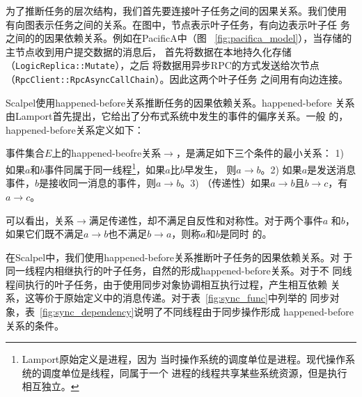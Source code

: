 
为了推断任务的层次结构，我们首先要连接叶子任务之间的因果关系。我们使用
有向图表示任务之间的关系。在图中，节点表示叶子任务，有向边表示叶子任
务之间的的因果依赖关系。例如在PacificA中（图
~\ref{fig:pacifica_model}），当存储的主节点收到用户提交数据的消息后，
首先将数据在本地持久化存储（\texttt{Logic\-Replica\-::Mutate}），之后
将数据用异步RPC的方式发送给次节点
（\texttt{Rpc\-Client\-::RpcAsync\-Call\-Chain}）。因此这两个叶子任务
之间用有向边连接。

Scalpel使用happened-before关系推断任务的因果依赖关系。happened-before
关系由Lamport首先提出，它给出了分布式系统中发生的事件的偏序关系。一般
的，happened-before关系定义如下：

\begin{definition}

事件集合$E$上的happened-beofre关系$\to$，是满足如下三个条件的最小关系：
1) 如果$a$和$b$事件同属于同一线程\footnote{Lamport原始定义是进程，因为
当时操作系统的调度单位是进程。现代操作系统的调度单位是线程，同属于一个
进程的线程共享某些系统资源，但是执行相互独立。}，如果$a$比$b$早发生，
则$a \to b$。2) 如果$a$是发送消息事件，$b$是接收同一消息的事件，则$a
\to b$。3) （传递性）如果$a \to b$且$b \to c$，有$a \to c$。

\end{definition}

可以看出，关系$\to$满足传递性，却不满足自反性和对称性。对于两个事件$a$
和$b$，如果它们既不满足$a \to b$也不满足$b \to a$，则称$a$和$b$是同时
的。

在Scalpel中，我们使用happened-before关系推断叶子任务的因果依赖关系。对
于同一线程内相继执行的叶子任务，自然的形成happened-before关系。对于不
同线程间执行的叶子任务，由于使用同步对象协调相互执行过程，产生相互依赖
关系，这等价于原始定义中的消息传递。对于表~\ref{fig:sync_func}中列举的
同步对象，表~\ref{fig:sync_dependency}说明了不同线程由于同步操作形成
happened-before关系的条件。

